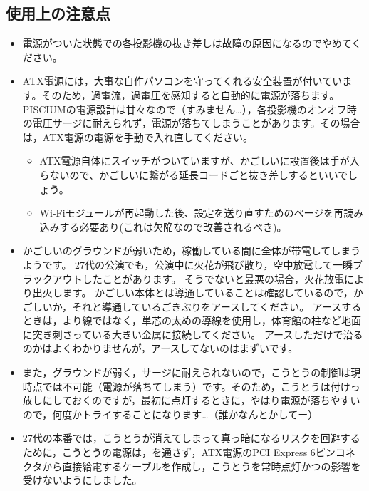 \documentclass[letterpaper,10pt,dvipdfmx]{sphinxmanual}
\begin{document}
\subsection{使用上の注意点}
\label{\detokenize{wireless/piscium:id3}}\begin{itemize}
\item {} 
電源がついた状態での各投影機の抜き差しは故障の原因になるのでやめてください。

\item {} 
ATX電源には，大事な自作パソコンを守ってくれる安全装置が付いています。そのため，過電流，過電圧を感知すると自動的に電源が落ちます。PISCIUMの電源設計は甘々なので（すみません…），各投影機のオンオフ時の電圧サージに耐えられず，電源が落ちてしまうことがあります。その場合は，ATX電源の電源を手動で入れ直してください。
\begin{itemize}
\item {} 
ATX電源自体にスイッチがついていますが、かごしいに設置後は手が入らないので、かごしいに繋がる延長コードごと抜き差しするといいでしょう。

\item {} 
Wi-Fiモジュールが再起動した後、設定を送り直すためのページを再読み込みする必要あり(これは欠陥なので改善されるべき)。

\end{itemize}

\item {} 
かごしいのグラウンドが弱いため，稼働している間に全体が帯電してしまうようです。
27代の公演でも，公演中に火花が飛び散り，空中放電して一瞬ブラックアウトしたことがあります。
そうでないと最悪の場合，火花放電により出火します。
かごしい本体とは導通していることは確認しているので，かごしいか，それと導通しているごきぶりをアースしてください。
アースするときは，より線ではなく，単芯の太めの導線を使用し，体育館の柱など地面に突き刺さっている大きい金属に接続してください。
アースしただけで治るのかはよくわかりませんが，アースしてないのはまずいです。

\item {} 
また，グラウンドが弱く，サージに耐えられないので，こうとうの制御は現時点では不可能（電源が落ちてしまう）です。そのため，こうとうは付けっ放しにしておくのですが，最初に点灯するときに，やはり電源が落ちやすいので，何度かトライすることになります…（誰かなんとかしてー）

\item {} 
27代の本番では，こうとうが消えてしまって真っ暗になるリスクを回避するために，こうとうの電源は，を通さず，ATX電源のPCI
Express
6ピンコネクタから直接給電するケーブルを作成し，こうとうを常時点灯かつの影響を受けないようにしました。


\end{itemize}
\end{document}
